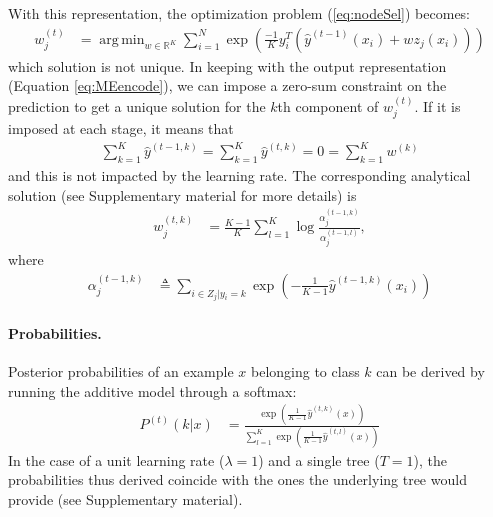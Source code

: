 \documentclass{article}
\DeclareMathOperator*{\argmin}{arg\,min}
\begin{document}
With this representation, the optimization problem (\ref{eq:nodeSel}) becomes:
\begin{align}\label{eq:MEmin}
w_j^{(t)} &=  \argmin_{w \in \mathbb{R}^K} \sum_{i=1}^N \exp 
\left(\frac{-1}{K} y_i^T \left(\hat{y}^{(t-1)}(x_i) + w z_j(x_i) \right)\right)
\end{align}
which solution is not unique.
In keeping with the output representation (Equation \ref{eq:MEencode}), we can 
impose a zero-sum constraint on the prediction to get a unique solution for the 
$k$th component of $w_j^{(t)}$. If it is imposed at each stage, it means that
\begin{align}\label{eq:MEzeroSum}
\sum_{k=1}^{K} \hat{y}^{(t-1, k)} = \sum_{k=1}^{K} 
\hat{y}^{(t, k)} = 0 = \sum_{k=1}^{K} w^{(k)}
\end{align}
and this is not impacted by the learning rate. The corresponding analytical solution (see 
Supplementary material for more details) is
\begin{align}\label{eq:MEsolution}
w_j^{(t,k)} &= \frac{K-1}{K}  \sum_{l=1}^{K} \log \frac{\alpha_j^{(t-1, 
k)}}{\alpha_j^{(t-1, l)}},
\end{align}
where
\begin{align}\label{eq:MEClsErrZS}
\alpha_j^{(t-1, k)} &\triangleq \sum_{i \in Z_j|y_i=k} \exp \left( 
-\frac{1}{K-1} \hat{y}^{(t-1, k)}(x_i) \right) 
\end{align}

\paragraph{Probabilities.}
Posterior probabilities of an example $x$ belonging to class $k$ can be derived 
by running the additive model through a softmax:
\begin{align}\label{eq:MEproba}
P^{(t)}(k|x) &= \frac{\exp \left(\frac{1}{K-1} \hat{y}^{(t, k)}(x) 
\right)}{\sum_{l=1}^K\exp \left(\frac{1}{K-1} \hat{y}^{(t, l)}(x) \right)}
\end{align}
In the case of a unit learning rate ($\lambda = 1$) and a single tree ($T=1$), 
the probabilities thus derived coincide with the ones the underlying tree would 
provide (see Supplementary material).
\end{document}
